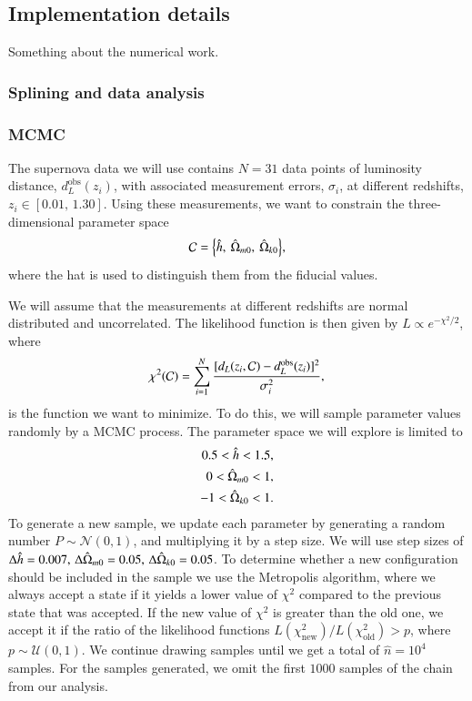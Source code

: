 
\subsection{Implementation details}\label{M1:implementation} 
Something about the numerical work.
\subsubsection{Splining and data analysis }


\subsubsection{MCMC }
The supernova data we will use contains $N=31$ data points of luminosity distance, $d_L^\mathrm{obs}(z_i)$, with associated measurement errors, $\sigma_i$, at different redshifts, $z_i\in[0.01,\,1.30]$. Using these measurements, we want to constrain the three-dimensional parameter space 
\begin{equation}
    \mathcal{C} = \Big\{ \hat{h},\: \hat{\Omega}_{m0},\: \hat{\Omega}_{k0} \Big\}, \label{eq:M1:implementations:supernova_parameter_space}
\end{equation}  
where the hat is used to distinguish them from the fiducial values.   

We will assume that the measurements at different redshifts are normal distributed and uncorrelated. The likelihood function is then given by $L\propto e^{-\chi^2/2}$, where 
\begin{equation}
    \chi^2(\mathcal{C}) = \sum_{i=1}^N \frac{[d_L(z_i, \mathcal{C}) - d_L^\mathrm{obs}(z_i)]^2}{\sigma_i^2}, \label{eq:M1:implementations:chi2_supernova_data}
\end{equation}
is the function we want to minimize.  To do this, we will sample parameter values randomly by a MCMC process. The parameter space we will explore is limited to  
\begin{equation} \label{eq:M1:implementations:supernova_parameter_ranges}
    \begin{split}
        0.5 < \hat{h} < 1.5, \\
        0 < \hat{\Omega}_{m0} < 1, \\
        -1 < \hat{\Omega}_{k0} < 1.
    \end{split}
\end{equation}   
To generate a new sample, we update each parameter by generating a random number $P\sim\mathcal{N}(0,1)$, and multiplying it by a step size. We will use step sizes of $\Delta \hat{h} = 0.007,\,\Delta \hat{\Omega}_{m0}=0.05,\,\Delta\hat{\Omega}_{k0}=0.05$. To determine whether a new configuration should be included in the sample we use the Metropolis algorithm, where we always accept a state if it yields a lower value of $\chi^2$ compared to the previous state that was accepted. If the new value of $\chi^2$ is greater than the old one, we accept it if the ratio of the likelihood functions $L(\chi^2_\mathrm{new})/L(\chi^2_\mathrm{old})>p$, where $p\sim\mathcal{U}(0,1)$. We continue drawing samples until we get a total of $\hat{n}=10^4$ samples. For the samples generated, we omit the first $1000$ samples of the chain from our analysis.   

